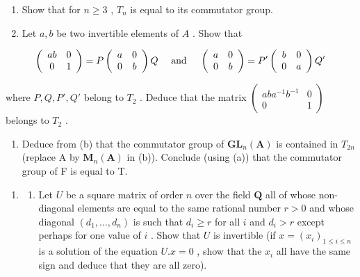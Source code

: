 \begin{enumerate}
\def\labelenumi{(\alph{enumi})}
\item
  Show that for \(n \geqslant 3\) , \(T_n\) is equal to its commutator group.
\item
  Let \(a, b\) be two invertible elements of \(A\) . Show that
\end{enumerate}

\[
\left( \begin{array}{c c} a b & 0 \\ 0 & 1 \end{array} \right) = P \left( \begin{array}{c c} a & 0 \\ 0 & b \end{array} \right) Q \quad \text { and } \quad \left( \begin{array}{c c} a & 0 \\ 0 & b \end{array} \right) = P ^ {\prime} \left( \begin{array}{c c} b & 0 \\ 0 & a \end{array} \right) Q ^ {\prime}
\]

where \(P, Q, P', Q'\) belong to \(T_2\) . Deduce that the matrix \(\begin{pmatrix} aba^{-1}b^{-1} & 0 \\ 0 & 1\end{pmatrix}\) belongs to \(T_2\) .

\begin{enumerate}
\def\labelenumi{(\alph{enumi})}
\setcounter{enumi}{2}
\tightlist
\item
  Deduce from (b) that the commutator group of \(\mathbf{GL}_{n}(\mathbf{A})\) is contained in \(T_{2n}\) (replace A by \(\mathbf{M}_{n}(\mathbf{A})\) in (b)). Conclude (using (a)) that the commutator group of F is equal to T.
\end{enumerate}

\begin{enumerate}
\def\labelenumi{\arabic{enumi}.}
\setcounter{enumi}{15}
\tightlist
\item
  \begin{enumerate}
  \def\labelenumii{(\alph{enumii})}
  \tightlist
  \item
    Let \(U\) be a square matrix of order \(n\) over the field \(\mathbf{Q}\) all of whose non-diagonal elements are equal to the same rational number \(r > 0\) and whose diagonal \((d_1, \ldots, d_n)\) is such that \(d_i \geqslant r\) for all \(i\) and \(d_i > r\) except perhaps for one value of \(i\) . Show that \(U\) is invertible (if \(x = (x_i)_{1 \leqslant i \leqslant n}\) is a solution of the equation \(U.x = 0\) , show that the \(x_i\) all have the same sign and deduce that they are all zero).
  \end{enumerate}
\end{enumerate}

